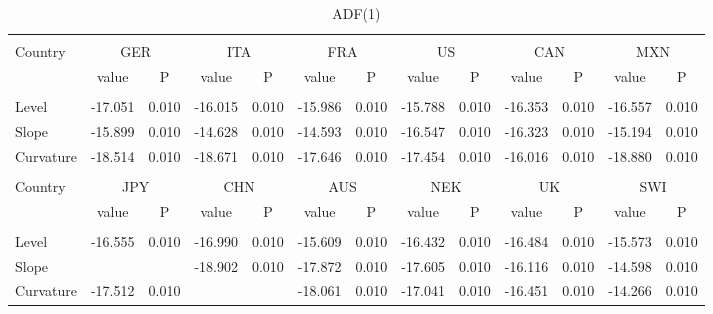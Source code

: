 \documentclass{article}
\begin{document}
\begin{table}[h]
\caption{ADF(1)} %
\fontsize{10}{10}\selectfont
\centering%
\begin{tabular}{l cc cc cc cc cc cc}%
\hline\hline \\ [-1.5ex]                         %

Country	&	\multicolumn{2}{c}{GER}			&	\multicolumn{2}{c}{ITA}			&	\multicolumn{2}{c}{FRA}			&	\multicolumn{2}{c}{US}			&	\multicolumn{2}{c}{CAN}			&	\multicolumn{2}{c}{MXN}			\\[0.5ex] 

 & value &P & value &P& value &P & value &P& value &P & value &P\\

\hline       \\ [-1.5ex] 

Level	&	-17.051	&	0.010	&	-16.015	&	0.010	&	-15.986	&	0.010	&	-15.788	&	0.010	&	-16.353	&	0.010	&	-16.557	&	0.010	\\
Slope	&	-15.899	&	0.010	&	-14.628	&	0.010	&	-14.593	&	0.010	&	-16.547	&	0.010	&	-16.323	&	0.010	&	-15.194	&	0.010	\\
\medskip
Curvature	&	-18.514	&	0.010	&	-18.671	&	0.010	&	-17.646	&	0.010	&	-17.454	&	0.010	&	-16.016	&	0.010	&	-18.880	&	0.010	\\


\hline\hline   \\ [-1.5ex]    

Country	&	\multicolumn{2}{c}{JPY}			&	\multicolumn{2}{c}{CHN}			&	\multicolumn{2}{c}{AUS}			&	\multicolumn{2}{c}{NEK}			&	\multicolumn{2}{c}{UK}			&	\multicolumn{2}{c}{SWI}			\\

 & value &P & value &P& value &P & value &P& value &P & value &P\\

\hline       \\ [-1.5ex] 

Level	&	-16.555	&	0.010	&	-16.990	&	0.010	&	-15.609	&	0.010	&	-16.432	&	0.010	&	-16.484	&	0.010	&	-15.573	&	0.010	\\
Slope	&		&		&	-18.902	&	0.010	&	-17.872	&	0.010	&	-17.605	&	0.010	&	-16.116	&	0.010	&	-14.598	&	0.010	\\
\medskip
Curvature	&	-17.512	&	0.010	&		&		&	-18.061	&	0.010	&	-17.041	&	0.010	&	-16.451	&	0.010	&	-14.266	&	0.010	\\


\hline            
\end{tabular}
\label{table:nonlin}%
\end{table}
\end{document}
